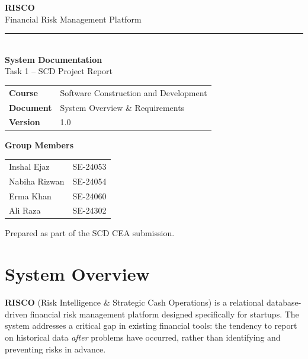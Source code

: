 \documentclass[12pt,a4paper]{article}
\begin{document}
\begin{titlepage}
    \centering
    \vspace*{2cm}

    {\Huge\bfseries\color{primaryblue} RISCO}\\[0.4cm]
    {\Large\color{darkgray} Financial Risk Management Platform}\\[0.2cm]
    \rule{\linewidth}{0.5pt}\\[1cm]

    {\LARGE\bfseries System Documentation}\\[0.3cm]
    {\large Task 1 – SCD Project Report}\\[2cm]

    \begin{tabular}{ll}
        \textbf{Course}   & Software Construction and Development \\[4pt]
        \textbf{Document} & System Overview \& Requirements \\[4pt]
        \textbf{Version}  & 1.0 \\
    \end{tabular}

    \vspace{1.5cm}

    {\large\bfseries\color{darkgray} Group Members}\\[0.4cm]
    \begin{tabular}{ll}
        Inshal Ejaz   & SE-24053 \\[4pt]
        Nabiha Rizwan & SE-24054 \\[4pt]
        Erma Khan     & SE-24060 \\[4pt]
        Ali Raza      & SE-24302 \\
    \end{tabular}

    \vfill
    {\small\color{darkgray} Prepared as part of the SCD CEA submission.}
\end{titlepage}

\tableofcontents
\newpage


\section{System Overview}


\textbf{RISCO} (Risk Intelligence \& Strategic Cash Operations) is a relational
database-driven financial risk management platform designed specifically for
startups. The system addresses a critical gap in existing financial tools:
the tendency to report on historical data \emph{after} problems have occurred,
rather than identifying and preventing risks in advance.
\end{document}

